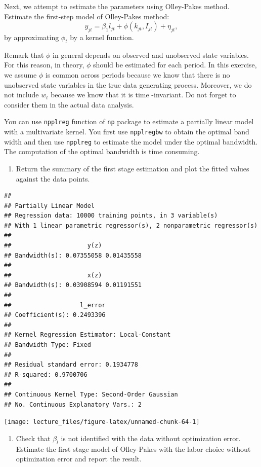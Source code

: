 \documentclass[
]{book}
\providecommand{\tightlist}{%
  \setlength{\itemsep}{0pt}\setlength{\parskip}{0pt}}
\begin{document}
Next, we attempt to estimate the parameters using Olley-Pakes method. Estimate the first-step model of Olley-Pakes method:
\[
y_{jt} = \beta_1 l_{jt} + \phi(k_{jt}, I_{jt}) + \eta_{jt},
\]
by approximating \(\phi_t\) by a kernel function.

Remark that \(\phi\) in general depends on observed and unobserved state variables. For this reason, in theory, \(\phi\) should be estimated for each period. In this exercise, we assume \(\phi\) is common across periods because we know that there is no unobserved state variables in the true data generating process. Moreover, we do not include \(w_t\) because we know that it is time -invariant. Do not forget to consider them in the actual data analysis.

You can use \texttt{npplreg} function of \texttt{np} package to estimate a partially linear model with a multivariate kernel. You first use \texttt{npplregbw} to obtain the optimal band width and then use \texttt{npplreg} to estimate the model under the optimal bandwidth. The computation of the optimal bandwidth is time consuming.

\begin{enumerate}
\def\labelenumi{\arabic{enumi}.}
\setcounter{enumi}{2}
\tightlist
\item
  Return the summary of the first stage estimation and plot the fitted values against the data points.
\end{enumerate}

\begin{verbatim}
## 
## Partially Linear Model
## Regression data: 10000 training points, in 3 variable(s)
## With 1 linear parametric regressor(s), 2 nonparametric regressor(s)
## 
##                     y(z)           
## Bandwidth(s): 0.07355058 0.01435558
## 
##                     x(z)           
## Bandwidth(s): 0.03908594 0.01191551
## 
##                   l_error
## Coefficient(s): 0.2493396
## 
## Kernel Regression Estimator: Local-Constant
## Bandwidth Type: Fixed
## 
## Residual standard error: 0.1934778
## R-squared: 0.9700706
## 
## Continuous Kernel Type: Second-Order Gaussian
## No. Continuous Explanatory Vars.: 2
\end{verbatim}

\begin{center}\texttt{[image: lecture\_files/figure-latex/unnamed-chunk-64-1]} \end{center}

\begin{enumerate}
\def\labelenumi{\arabic{enumi}.}
\setcounter{enumi}{3}
\tightlist
\item
  Check that \(\beta_l\) is not identified with the data without optimization error. Estimate the first stage model of Olley-Pakes with the labor choice without optimization error and report the result.
\end{enumerate}
\end{document}

